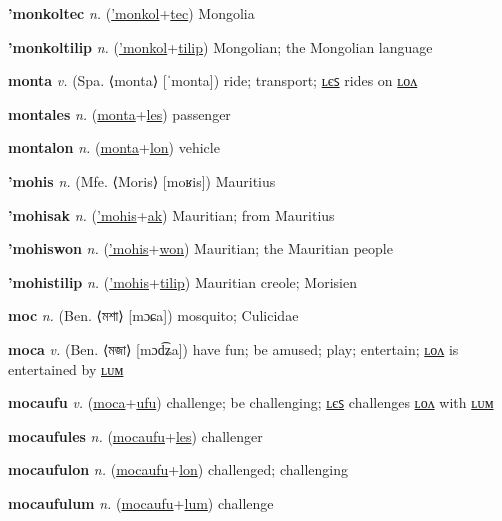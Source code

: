 \textbf{\hypertarget{'monkoltec}{'monkoltec}} \textit{n.} (\hyperlink{'monkol}{'monkol}+\allowbreak \hyperlink{tec}{tec})
Mongolia

\textbf{\hypertarget{'monkoltilip}{'monkoltilip}} \textit{n.} (\hyperlink{'monkol}{'monkol}+\allowbreak \hyperlink{tilip}{tilip})
Mongolian; the Mongolian language

\textbf{\hypertarget{monta}{monta}} \textit{v.} (Spa. ⟨monta⟩ [ˈmonta])
ride; transport; \hyperlink{montales}{ʟєꜱ} rides on \hyperlink{montalon}{ʟᴏᴧ}

\textbf{\hypertarget{montales}{montales}} \textit{n.} (\hyperlink{monta}{monta}+\allowbreak \hyperlink{les}{les})
passenger

\textbf{\hypertarget{montalon}{montalon}} \textit{n.} (\hyperlink{monta}{monta}+\allowbreak \hyperlink{lon}{lon})
vehicle

\textbf{\hypertarget{'mohis}{'mohis}} \textit{n.} (Mfe. ⟨Moris⟩ [moʁis])
Mauritius

\textbf{\hypertarget{'mohisak}{'mohisak}} \textit{n.} (\hyperlink{'mohis}{'mohis}+\allowbreak \hyperlink{ak}{ak})
Mauritian; from Mauritius

\textbf{\hypertarget{'mohiswon}{'mohiswon}} \textit{n.} (\hyperlink{'mohis}{'mohis}+\allowbreak \hyperlink{won}{won})
Mauritian; the Mauritian people

\textbf{\hypertarget{'mohistilip}{'mohistilip}} \textit{n.} (\hyperlink{'mohis}{'mohis}+\allowbreak \hyperlink{tilip}{tilip})
Mauritian creole; Morisien

\textbf{\hypertarget{moc}{moc}} \textit{n.} (Ben. ⟨{\bengali{}মশা}⟩ [mɔɕa])
mosquito; Culicidae

\textbf{\hypertarget{moca}{moca}} \textit{v.} (Ben. ⟨{\bengali{}মজা}⟩ [mɔd͡ʑa])
have fun; be amused; play; entertain; \hyperlink{mocalon}{ʟᴏᴧ} is entertained by \hyperlink{mocalum}{ʟᴜᴍ}

\textbf{\hypertarget{mocaufu}{mocaufu}} \textit{v.} (\hyperlink{moca}{moca}+\allowbreak \hyperlink{ufu}{ufu})
challenge; be challenging; \hyperlink{mocaufules}{ʟєꜱ} challenges \hyperlink{mocaufulon}{ʟᴏᴧ} with \hyperlink{mocaufulum}{ʟᴜᴍ}

\textbf{\hypertarget{mocaufules}{mocaufules}} \textit{n.} (\hyperlink{mocaufu}{mocaufu}+\allowbreak \hyperlink{les}{les})
challenger

\textbf{\hypertarget{mocaufulon}{mocaufulon}} \textit{n.} (\hyperlink{mocaufu}{mocaufu}+\allowbreak \hyperlink{lon}{lon})
challenged; challenging

\textbf{\hypertarget{mocaufulum}{mocaufulum}} \textit{n.} (\hyperlink{mocaufu}{mocaufu}+\allowbreak \hyperlink{lum}{lum})
challenge

